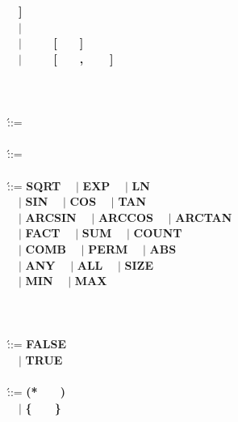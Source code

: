 \begin{bnf_tabbing}
              ~~{\bf ]} \\
\> ~~$|$ \>  \\
\> ~~$|$ \> ~~
   {\bf ~~[}~~~~{\bf ]} \\
\> ~~$|$ \> ~~
   {\bf ~~[}~~~~{\bf ,}~~
              ~~{\bf ]} \\
\\
\\
\\
\>  \' ::= \>
    \\
\\
\>  \' ::= \>
    \\
\\
\builtintabbing
\>  \' ::= \>
            {\bf SQRT}   \> ~~$|$ \> {\bf EXP}    \> ~~$|$ \> {\bf LN} \\
\> ~~$|$ \> {\bf SIN}    \> ~~$|$ \> {\bf COS}    \> ~~$|$ \> {\bf TAN} \\
\> ~~$|$ \> {\bf ARCSIN} \> ~~$|$ \> {\bf ARCCOS} \> ~~$|$ \> {\bf ARCTAN} \\
\> ~~$|$ \> {\bf FACT}   \> ~~$|$ \> {\bf SUM}    \> ~~$|$ \> {\bf COUNT} \\
\> ~~$|$ \> {\bf COMB}   \> ~~$|$ \> {\bf PERM}   \> ~~$|$ \> {\bf ABS} \\
\> ~~$|$ \> {\bf ANY}    \> ~~$|$ \> {\bf ALL}    \> ~~$|$ \> {\bf SIZE} \\
\> ~~$|$ \> {\bf MIN}    \> ~~$|$ \> {\bf MAX} \\
\bnftabbing
\\
\\
\\
\>  \' ::= \> {\bf FALSE} \\
\> ~~$|$ \> {\bf TRUE} \\
\\
\>  \' ::= \>
   {\bf (*}~~~~{\bf *)} \\
\> ~~$|$ \>
   {\bf \{}~~~~{\bf \}} \\
\\

\end{bnf_tabbing}
